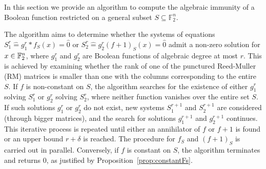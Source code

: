 \documentclass[11pt]{llncs}
\begin{document}
In this section we provide an algorithm to compute the algebraic immunity of a Boolean function restricted on a general subset $S \subseteq \mathbb{F}_2^n$. 



The algorithm aims to determine whether the systems of equations $S_1^r \hat{=}g_1^r*f_S (x)= \hat{0}$ or $S_2^r\hat{=}g_2^r (f+ 1)_S (x) = \hat{0}$ admit a non-zero solution for $x \in \mathbb{F}_2^n$, where $g_1^r$ and $ g_2^r$ are Boolean functions of algebraic degree at most $ r$. 
This is achieved by examining whether the rank of one of the punctured Reed-Muller (RM) matrices is smaller than one with the columns corresponding to the entire $S$.
If $f$ is non-constant on $S$, the algorithm searches for the existence of either $g_1^r$ solving $S_1^r$ or $g_2^r$ solving $S_2^r$, where neither function vanishes over the entire set \( S \). 
If such solutions \( g_1^r \) or \( g_2^r \) do not exist, new systems \( S_1^{r+1} \) and \( S_2^{r+1} \) are considered (through bigger matrices), and the search for solutions \( g_1^{r+1} \) and \( g_2^{r+1} \) continues. This iterative process is repeated until either an annihilator of \( f \) or \( f + 1 \) is found or an upper bound \( r + \delta \) is reached. The procedure for \( f_S \) and \( (f + 1)_S \) is carried out in parallel.
Conversely, if \( f \) is constant on \( S \), the algorithm terminates and returns \( 0 \), as justified by Proposition~\ref{prop:constantFs}.
\end{document}
